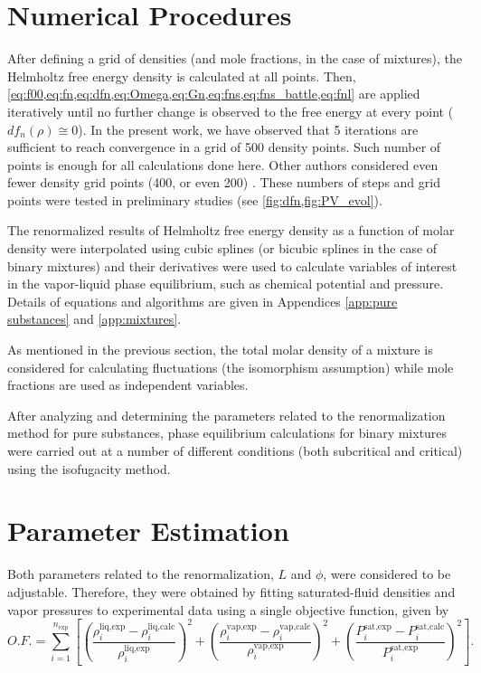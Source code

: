 \documentclass[preprint,12pt,3p]{elsarticle}
\begin{document}
\section{Numerical Procedures}

After defining a grid of densities (and mole fractions, in the case of mixtures), the Helmholtz free energy density is calculated at all points.
Then, \cref{eq:f00,eq:fn,eq:dfn,eq:Omega,eq:Gn,eq:fns,eq:fns_battle,eq:fnl} are applied iteratively until no further change is observed to the free energy at every point ($df_{n}(\rho) \cong 0$).
In the present work, we have observed that 5 iterations are sufficient to reach convergence in a grid of 500 density points.
Such number of points is enough for all calculations done here.
Other authors considered even fewer density grid points (400, or even 200) \cite{cai2004thermodynamics}.
These numbers of steps and grid points were tested in preliminary studies (see \cref{fig:dfn,fig:PV_evol}).

The renormalized results of Helmholtz free energy density as a function of molar density were interpolated using cubic splines (or bicubic splines in the case of binary mixtures) and their derivatives were used to calculate variables of interest in the vapor-liquid phase equilibrium, such as chemical potential and pressure.
Details of equations and algorithms are given in Appendices \ref{app:pure substances} and \ref{app:mixtures}.

As mentioned in the previous section, the total molar density of a mixture is considered for calculating fluctuations (the isomorphism assumption) while mole fractions are used as independent variables.

After analyzing and determining the parameters related to the renormalization method for pure substances, phase equilibrium calculations for binary mixtures were carried out at a number of different conditions (both subcritical and critical) using the isofugacity method.

\section{Parameter Estimation}
\label{sec:Parameter Estimation}

Both parameters related to the renormalization, $L$ and $\phi$, were considered to be adjustable.
Therefore, they were obtained by fitting saturated-fluid densities and vapor pressures to experimental data using a single objective function, given by
\begin{equation}   \label{eq:OF}
O.F.=\sum_{i=1}^{n_\text{exp}}\left[ \left(\frac{\rho_{i}^\text{liq,exp}-\rho_{i}^\text{liq,calc}}{\rho_{i}^\text{liq,exp}}\right)^2 + \left(\frac{\rho_{i}^\text{vap,exp}-\rho_{i}^\text{vap,calc}}{\rho_{i}^\text{vap,exp}}\right)^2 + \left(\frac{P_{i}^\text{sat,exp}-P_{i}^\text{sat,calc}}{P_{i}^\text{sat,exp}}\right)^2\right].
\end{equation}
\end{document}
